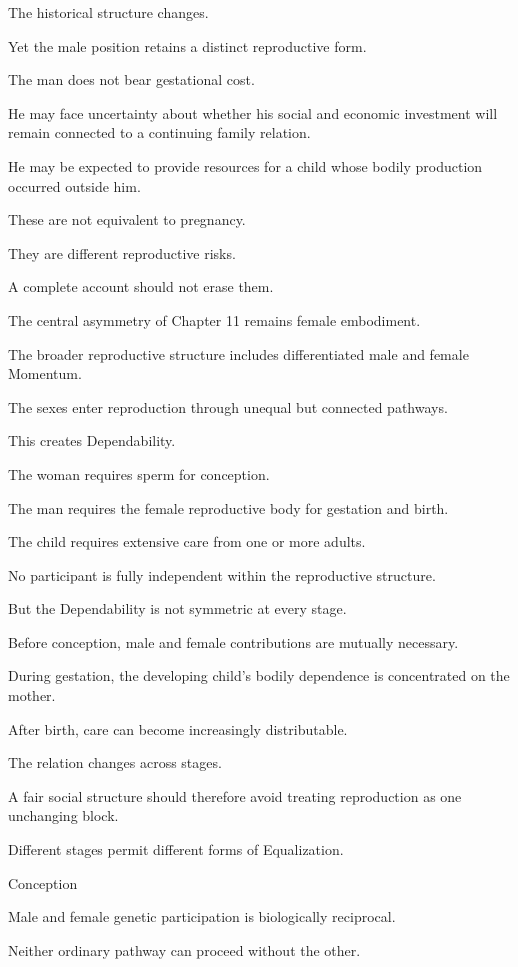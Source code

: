 The historical structure changes.

Yet the male position retains a distinct reproductive form.

The man does not bear gestational cost.

He may face uncertainty about whether his social and economic investment will remain connected to a continuing family relation.

He may be expected to provide resources for a child whose bodily production occurred outside him.

These are not equivalent to pregnancy.

They are different reproductive risks.

A complete account should not erase them.

The central asymmetry of Chapter 11 remains female embodiment.

The broader reproductive structure includes differentiated male and female Momentum.

The sexes enter reproduction through unequal but connected pathways.

This creates Dependability.

The woman requires sperm for conception.

The man requires the female reproductive body for gestation and birth.

The child requires extensive care from one or more adults.

No participant is fully independent within the reproductive structure.

But the Dependability is not symmetric at every stage.

Before conception, male and female contributions are mutually necessary.

During gestation, the developing child’s bodily dependence is concentrated on the mother.

After birth, care can become increasingly distributable.

The relation changes across stages.

A fair social structure should therefore avoid treating reproduction as one unchanging block.

Different stages permit different forms of Equalization.

Conception

Male and female genetic participation is biologically reciprocal.

Neither ordinary pathway can proceed without the other.

